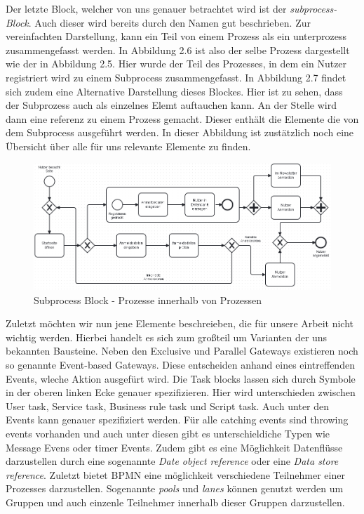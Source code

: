 Der letzte Block, welcher von uns genauer betrachtet wird ist der \emph{subprocess-Block}. Auch dieser wird bereits durch den Namen gut beschrieben. Zur vereinfachten Darstellung, kann ein Teil von einem Prozess als ein unterprozess zusammengefasst werden. In Abbildung 2.6 ist also der selbe Prozess dargestellt wie der in Abbildung 2.5. Hier wurde der Teil des Prozesses, in dem ein Nutzer registriert wird zu einem Subprocess zusammengefasst. In Abbildung 2.7 findet sich zudem eine Alternative Darstellung dieses Blockes. Hier ist zu sehen, dass der Subprozess auch als einzelnes Elemt auftauchen kann. An der Stelle wird dann eine referenz zu einem Prozess gemacht. Dieser enthält die Elemente die von dem Subprocess ausgeführt werden. In dieser Abbildung ist zustätzlich noch eine Übersicht über alle für uns relevante Elemente zu finden. 

\begin{figure}
\centering
\includegraphics[scale=0.5]{Figures/Beispiel7}
\decoRule
\caption[Subprocess Block]{Subprocess Block - Prozesse innerhalb von Prozessen}
\label{fig:Task}
\end{figure}

Zuletzt möchten wir nun jene Elemente beschreieben, die für unsere Arbeit nicht wichtig werden. Hierbei handelt es sich zum großteil um Varianten der uns bekannten Bausteine. Neben den Exclusive und Parallel Gateways existieren noch so genannte Event-based Gateways. Diese entscheiden anhand eines eintreffenden Events, wleche Aktion ausgefürt wird. 
Die Task blocks lassen sich durch Symbole in der oberen linken Ecke genauer spezifizieren. Hier wird unterschieden zwischen User task, Service task, Business rule task und Script task. Auch unter den Events kann genauer spezifiziert werden. Für alle catching events sind throwing events vorhanden und auch unter diesen gibt es unterschieldiche Typen wie Message Evens oder timer Events. Zudem gibt es eine Möglichkeit Datenflüsse darzustellen durch eine sogenannte \emph{Date object reference} oder eine \emph{Data store reference}. Zuletzt bietet BPMN eine möglichkeit verschiedene Teilnehmer einer Prozesses darzustellen. Sogenannte \emph{pools} und \emph{lanes} können genutzt werden um Gruppen und auch einzenle Teilnehmer innerhalb dieser Gruppen darzustellen.


